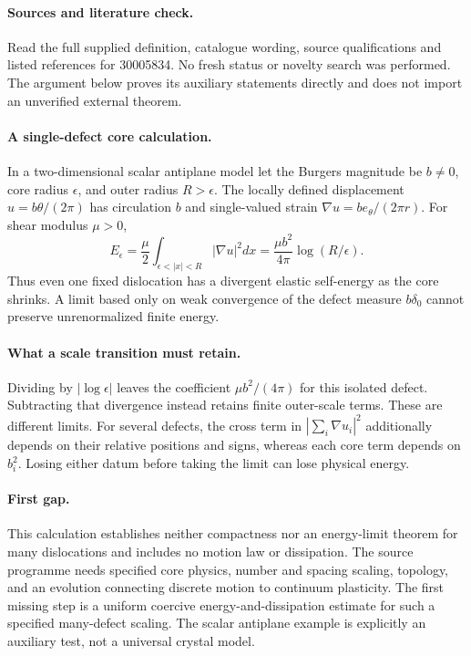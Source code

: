 \documentclass[11pt]{article}
\begin{document}
\paragraph{Sources and literature check.}
Read the full supplied definition, catalogue wording, source qualifications and listed references for 30005834. No fresh status or novelty search was performed. The argument below proves its auxiliary statements directly and does not import an unverified external theorem.

\paragraph{A single-defect core calculation.} In a two-dimensional scalar antiplane model let the Burgers magnitude be \(b\ne0\), core radius \(\epsilon\), and outer radius \(R>\epsilon\). The locally defined displacement \(u=b\theta/(2\pi)\) has circulation \(b\) and single-valued strain \(\nabla u=b e_\theta/(2\pi r)\). For shear modulus \(\mu>0\),
\[
 E_\epsilon=\frac\mu2\int_{\epsilon<|x|<R}|\nabla u|^2dx
 =\frac{\mu b^2}{4\pi}\log(R/\epsilon).
\]
Thus even one fixed dislocation has a divergent elastic self-energy as the core shrinks. A limit based only on weak convergence of the defect measure \(b\delta_0\) cannot preserve unrenormalized finite energy.
\paragraph{What a scale transition must retain.} Dividing by \(|\log\epsilon|\) leaves the coefficient \(\mu b^2/(4\pi)\) for this isolated defect. Subtracting that divergence instead retains finite outer-scale terms. These are different limits. For several defects, the cross term in \(|\sum_i\nabla u_i|^2\) additionally depends on their relative positions and signs, whereas each core term depends on \(b_i^2\). Losing either datum before taking the limit can lose physical energy.
\paragraph{First gap.} This calculation establishes neither compactness nor an energy-limit theorem for many dislocations and includes no motion law or dissipation. The source programme needs specified core physics, number and spacing scaling, topology, and an evolution connecting discrete motion to continuum plasticity. The first missing step is a uniform coercive energy-and-dissipation estimate for such a specified many-defect scaling. The scalar antiplane example is explicitly an auxiliary test, not a universal crystal model.
\end{document}
